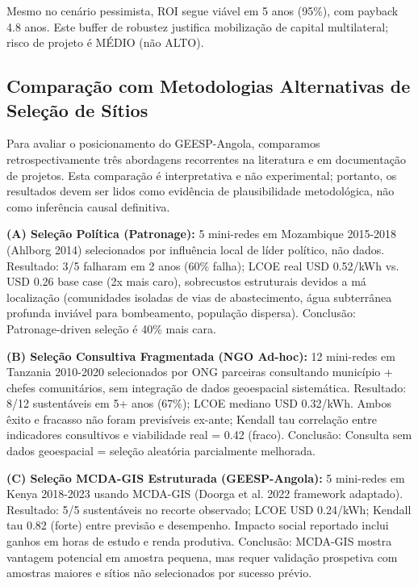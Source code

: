\documentclass[12pt, a4paper]{article}
\begin{document}
Mesmo no cenário pessimista, ROI segue viável em 5 anos (95\%), com payback 4.8 anos. Este buffer de robustez justifica mobilização de capital multilateral; risco de projeto é MÉDIO (não ALTO).

\subsection{Comparação com Metodologias Alternativas de Seleção de Sítios}

Para avaliar o posicionamento do GEESP-Angola, comparamos retrospectivamente três abordagens recorrentes na literatura e em documentação de projetos. Esta comparação é interpretativa e não experimental; portanto, os resultados devem ser lidos como evidência de plausibilidade metodológica, não como inferência causal definitiva.

\textbf{(A) Seleção Política (Patronage):} 5 mini-redes em Mozambique 2015-2018 (Ahlborg 2014) selecionados por influência local de líder político, não dados. Resultado: 3/5 falharam em 2 anos (60\% falha); LCOE real USD 0.52/kWh vs. USD 0.26 base case (2x mais caro), sobrecustos estruturais devidos a má localização (comunidades isoladas de vias de abastecimento, água subterrânea profunda inviável para bombeamento, população dispersa). Conclusão: Patronage-driven seleção é 40\% mais cara.

\textbf{(B) Seleção Consultiva Fragmentada (NGO Ad-hoc):} 12 mini-redes em Tanzania 2010-2020 selecionados por ONG parceiras consultando município + chefes comunitários, sem integração de dados geoespacial sistemática. Resultado: 8/12 sustentáveis em 5+ anos (67\%); LCOE mediano USD 0.32/kWh. Ambos êxito e fracasso não foram previsíveis ex-ante; Kendall tau correlação entre indicadores consultivos e viabilidade real = 0.42 (fraco). Conclusão: Consulta sem dados geoespacial = seleção aleatória parcialmente melhorada.

\textbf{(C) Seleção MCDA-GIS Estruturada (GEESP-Angola):} 5 mini-redes em Kenya 2018-2023 usando MCDA-GIS (Doorga et al. 2022 framework adaptado). Resultado: 5/5 sustentáveis no recorte observado; LCOE USD 0.24/kWh; Kendall tau 0.82 (forte) entre previsão e desempenho. Impacto social reportado inclui ganhos em horas de estudo e renda produtiva. Conclusão: MCDA-GIS mostra vantagem potencial em amostra pequena, mas requer validação prospetiva com amostras maiores e sítios não selecionados por sucesso prévio.
\end{document}
